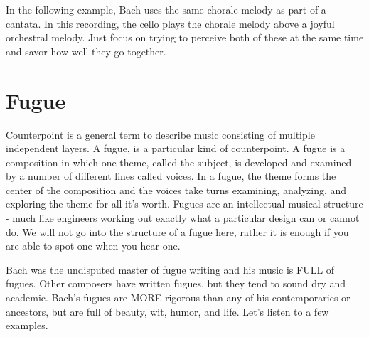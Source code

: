 In the following example, Bach uses the same chorale melody as part of a cantata. In this recording, the cello plays the chorale melody above a joyful orchestral melody. Just focus on trying to perceive both of these at the same time and savor how well they go together.


\section{Fugue}
Counterpoint is a general term to describe music consisting of multiple independent layers. A fugue, is a particular kind of counterpoint. A fugue is a composition in which one theme, called the subject, is developed and examined by a number of different lines called voices. In a fugue, the theme forms the center of the composition and the voices take turns examining, analyzing, and exploring the theme for all it's worth. Fugues are an intellectual musical structure - much like engineers working out exactly what a particular design can or cannot do.  We will not go into the structure of a fugue here, rather it is enough if you are able to spot one when you hear one. 



Bach was the undisputed master of fugue writing and his music is FULL of fugues. Other composers have written fugues, but they tend to sound dry and academic. Bach's fugues are MORE rigorous than any of his contemporaries or ancestors, but are full of beauty, wit, humor, and life. Let's listen to a few examples.



